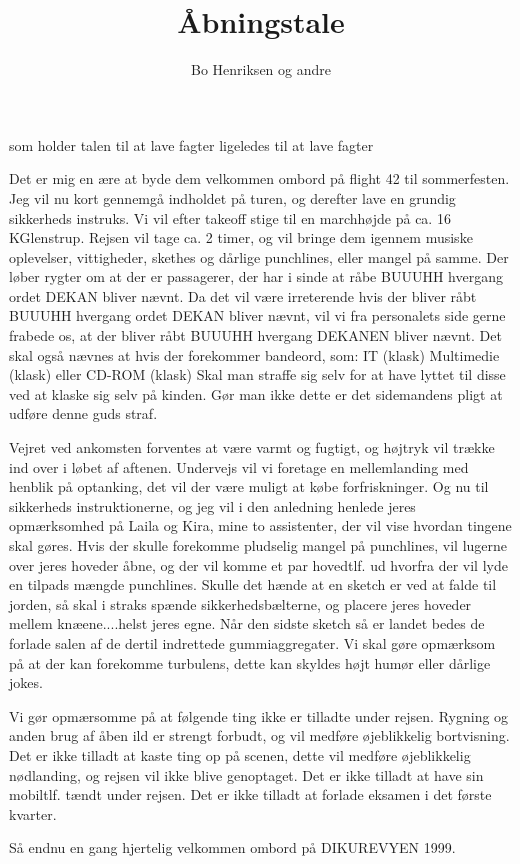 \documentclass[danish]{article}
\title{Åbningstale}
\author{Bo Henriksen og andre}
\begin{document}
\maketitle

\begin{roles}
   som holder talen
   til at lave fagter
   ligeledes til at lave fagter 
\end{roles}


\begin{sketch}
Det er mig en ære at byde dem velkommen ombord på flight 42 til sommerfesten.
Jeg vil nu kort gennemgå indholdet på turen, og derefter lave en grundig
sikkerheds instruks.
       Vi vil efter takeoff stige til en marchhøjde på ca. 16 KGlenstrup.
Rejsen vil tage ca. 2 timer, og vil bringe dem igennem musiske oplevelser, 
vittigheder, skethes og dårlige punchlines, eller mangel på samme.
Der løber rygter om at der er passagerer, der har i sinde at råbe BUUUHH
hvergang ordet DEKAN bliver nævnt. Da det vil være irreterende hvis der bliver
råbt BUUUHH hvergang ordet DEKAN bliver nævnt, vil vi fra personalets side 
gerne frabede os, at der bliver råbt BUUUHH hvergang DEKANEN bliver nævnt.
Det skal også nævnes at hvis der forekommer bandeord, som:
IT (klask)
Multimedie (klask)
eller
CD-ROM (klask)
Skal man straffe sig selv for at have lyttet til disse ved at klaske sig selv på kinden. Gør man ikke dette er det sidemandens pligt at udføre denne guds straf.

Vejret ved ankomsten forventes at være varmt og fugtigt, og højtryk vil trække ind over i løbet af aftenen. Undervejs vil vi
foretage en mellemlanding med henblik på optanking, det vil der være muligt
at købe forfriskninger.
Og nu til sikkerheds instruktionerne, og jeg vil i den anledning henlede
jeres opmærksomhed på Laila og Kira, mine to assistenter, der vil vise hvordan tingene skal gøres.
Hvis der skulle forekomme pludselig mangel på punchlines, vil lugerne over
jeres hoveder åbne, og der vil komme et par hovedtlf. ud hvorfra der vil
lyde en tilpads mængde punchlines.
     Skulle det hænde at en sketch er ved at falde til jorden, 
så skal i straks spænde
sikkerhedsbælterne, og placere jeres hoveder mellem knæene....helst jeres egne.
Når den sidste sketch så er landet bedes de forlade salen af de dertil indrettede gummiaggregater.
Vi skal gøre opmærksom på at der kan forekomme turbulens, dette
kan skyldes højt humør eller dårlige jokes.

         Vi gør opmærsomme på at følgende ting ikke er tilladte under rejsen.
Rygning og anden brug af åben ild er strengt forbudt, og vil medføre 
øjeblikkelig bortvisning.
Det er ikke tilladt at kaste ting op på scenen, dette vil medføre
øjeblikkelig nødlanding, og rejsen vil ikke blive genoptaget.
Det er ikke tilladt at have sin mobiltlf. tændt under rejsen.
Det er ikke tilladt at forlade eksamen i det første kvarter.



Så endnu en gang hjertelig velkommen ombord på DIKUREVYEN 1999.

\end{sketch}
\end{document}

